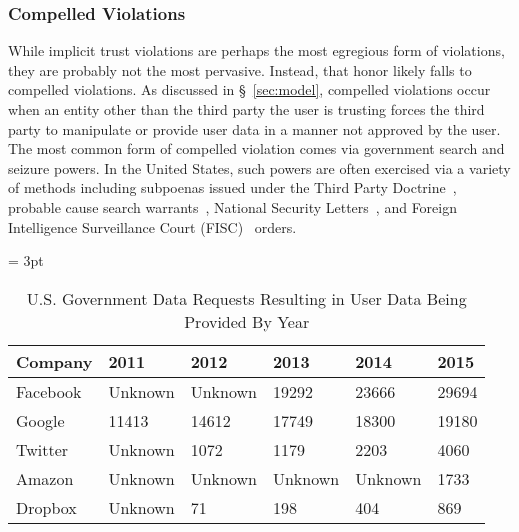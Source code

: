 \subsubsection{Compelled Violations}

While implicit trust violations are perhaps the most egregious form of
violations, they are probably not the most pervasive. Instead, that
honor likely falls to compelled violations. As discussed in
\S~\ref{sec:model}, compelled violations occur when an entity other
than the third party the user is trusting forces the third party to
manipulate or provide user data in a manner not approved by the
user. The most common form of compelled violation comes via government
search and seizure powers. In the United States, such powers are often
exercised via a variety of methods including subpoenas issued under
the Third Party Doctrine~\cite{thompson-thirdparty}, probable cause
search warrants~\cite{us-constitution-amend4}, National Security
Letters~\cite{fbi-nsl}, and Foreign Intelligence Surveillance Court
(FISC)~\cite{fisc} orders.

\begin{table}[thb]
  \footnotesize
  \centering
  \tabulinesep = 3pt
  \begin{tabu} to \textwidth
    { | X[2,c,m]
      | X[1,c,m]
      | X[1,c,m]
      | X[1,c,m]
      | X[1,c,m]
      | X[1,c,m]
      | }
    \hline
    \textbf{Company}
    & \textbf{2011}
    & \textbf{2012}
    & \textbf{2013}
    & \textbf{2014}
    & \textbf{2015}
    \\ \hline 
    Facebook
    & Unknown
    & Unknown
    & 19292
    & 23666
    & 29694
    \\ \hline
    Google
    & 11413
    & 14612
    & 17749
    & 18300
    & 19180
    \\ \hline
    Twitter
    & Unknown
    & 1072
    & 1179
    & 2203
    & 4060
    \\ \hline 
    Amazon
    & Unknown
    & Unknown
    & Unknown
    & Unknown
    & 1733
    \\ \hline 
    Dropbox
    & Unknown
    & 71
    & 198
    & 404
    & 869
    \\ \hline 
 \end{tabu}
  \caption{ U.S. Government Data Requests Resulting in User Data Being
    Provided By Year }
  \label{tab:analysis:violations:reports}
\end{table}

